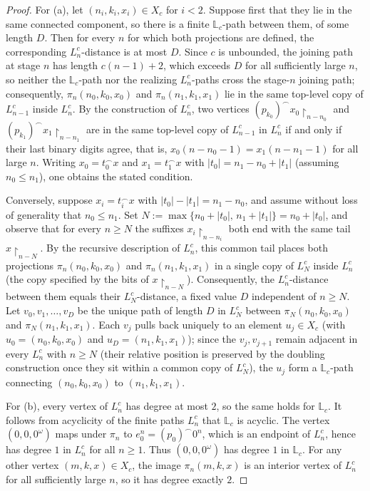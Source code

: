 \begin{proof}
    For (a), let $(n_i,k_i,x_i)\in X_c$ for $i<2$.
    Suppose first that they lie in the same connected component, so there is a finite $\mathbb L_c$-path between them, of some length $D$.
    Then for every $n$ for which both projections are defined, the corresponding $L^c_n$-distance is at most $D$.
    Since $c$ is unbounded, the joining path at stage $n$ has length $c(n-1)+2$, which exceeds $D$ for all sufficiently large $n$, so neither the $\mathbb L_c$-path nor the realizing $L^c_n$-paths cross the stage-$n$ joining path; consequently, $\pi_n(n_0,k_0,x_0)$ and $\pi_n(n_1,k_1,x_1)$ lie in the same top-level copy of $L^c_{n-1}$ inside $L^c_n$.
    By the construction of $L^c_n$, two vertices $(p_{k_0})^\smallfrown x_0\restriction_{n-n_0}$ and $(p_{k_1})^\smallfrown x_1\restriction_{n-n_1}$ are in the same top-level copy of $L^c_{n-1}$ in $L^c_n$ if and only if their last binary digits agree, that is, $x_0(n-n_0-1)=x_1(n-n_1-1)$ for all large $n$.
    Writing $x_0=t_0^\smallfrown x$ and $x_1=t_1^\smallfrown x$ with $|t_0|=n_1-n_0+|t_1|$ (assuming $n_0\leq n_1$), one obtains the stated condition.

    Conversely, suppose $x_i=t_i^\smallfrown x$ with $|t_0|-|t_1|=n_1-n_0$, and assume without loss of generality that $n_0\leq n_1$.
    Set $N:=\max\{n_0+|t_0|,\,n_1+|t_1|\}=n_0+|t_0|$, and observe that for every $n\geq N$ the suffixes $x_i\restriction_{n-n_i}$ both end with the same tail $x\restriction_{n-N}$.
    By the recursive description of $L^c_n$, this common tail places both projections $\pi_n(n_0,k_0,x_0)$ and $\pi_n(n_1,k_1,x_1)$ in a single copy of $L^c_N$ inside $L^c_n$ (the copy specified by the bits of $x\restriction_{n-N}$).
    Consequently, the $L^c_n$-distance between them equals their $L^c_N$-distance, a fixed value $D$ independent of $n\geq N$.
    Let $v_0,v_1,\dots,v_D$ be the unique path of length $D$ in $L^c_N$ between $\pi_N(n_0,k_0,x_0)$ and $\pi_N(n_1,k_1,x_1)$.
    Each $v_j$ pulls back uniquely to an element $u_j\in X_c$ (with $u_0=(n_0,k_0,x_0)$ and $u_D=(n_1,k_1,x_1)$); since the $v_j,v_{j+1}$ remain adjacent in every $L^c_n$ with $n\geq N$ (their relative position is preserved by the doubling construction once they sit within a common copy of $L^c_N$), the $u_j$ form a $\mathbb L_c$-path connecting $(n_0,k_0,x_0)$ to $(n_1,k_1,x_1)$.

    For (b), every vertex of $L^c_n$ has degree at most $2$, so the same holds for $\mathbb L_c$.
    It follows from acyclicity of the finite paths $L^c_n$ that $\mathbb L_c$ is acyclic.
    The vertex $(0,0,0^\omega)$ maps under $\pi_n$ to $e_0^n=(p_0)^\smallfrown 0^n$, which is an endpoint of $L^c_n$, hence has degree $1$ in $L^c_n$ for all $n\geq1$.
    Thus $(0,0,0^\omega)$ has degree $1$ in $\mathbb L_c$.
    For any other vertex $(m,k,x)\in X_c$, the image $\pi_n(m,k,x)$ is an interior vertex of $L^c_n$ for all sufficiently large $n$, so it has degree exactly $2$.


\end{proof}
